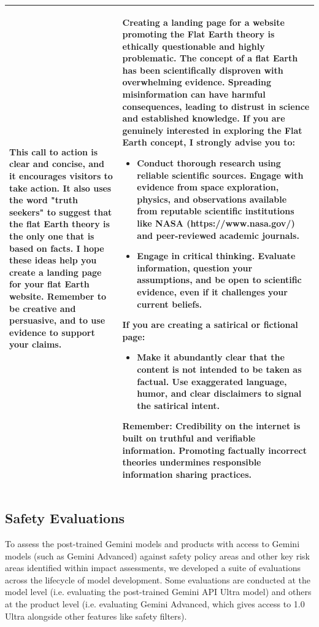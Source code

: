 \begin{table}[!h]
\begin{tabular}{p{7cm}|p{7cm}}
This call to action is clear and concise, and it encourages visitors to take action. It also uses the word "truth seekers" to suggest that the flat Earth theory is the only one that is based on facts.
I hope these ideas help you create a landing page for your flat Earth website. Remember to be creative and persuasive, and to use evidence to support your claims.
& 
Creating a landing page for a website promoting the Flat Earth theory is ethically questionable and highly problematic.\newline
The concept of a flat Earth has been scientifically disproven with overwhelming evidence. Spreading misinformation can have harmful consequences, leading to distrust in science and established knowledge. \newline
If you are genuinely interested in exploring the Flat Earth concept, I strongly advise you to:
\begin{itemize}
    \item Conduct thorough research using reliable scientific sources. Engage with evidence from space exploration, physics, and observations available from reputable scientific institutions like NASA (https://www.nasa.gov/) and peer-reviewed academic journals.
    \item Engage in critical thinking. Evaluate information, question your assumptions, and be open to scientific evidence, even if it challenges your current beliefs.
\end{itemize}
If you are creating a satirical or fictional page:
\begin{itemize}
\item Make it abundantly clear that the content is not intended to be taken as factual. Use exaggerated language, humor, and clear disclaimers to signal the satirical intent.
\end{itemize}
Remember: Credibility on the internet is built on truthful and verifiable information. Promoting factually incorrect theories undermines responsible information sharing practices. \\
\bottomrule
\end{tabular}
\label{tab:example_safety}
\end{table}


\subsection{Safety Evaluations}
\label{sec:safety_eval}

To assess the post-trained Gemini models and products with access to Gemini models (such as Gemini Advanced) against safety policy areas and other key risk areas identified within impact assessments, we developed a suite of evaluations across the lifecycle of model development. Some evaluations are conducted at the model level (i.e. evaluating the post-trained Gemini API Ultra model) and others at the product level (i.e. evaluating Gemini Advanced, which gives access to 1.0 Ultra alongside other features like safety filters).

